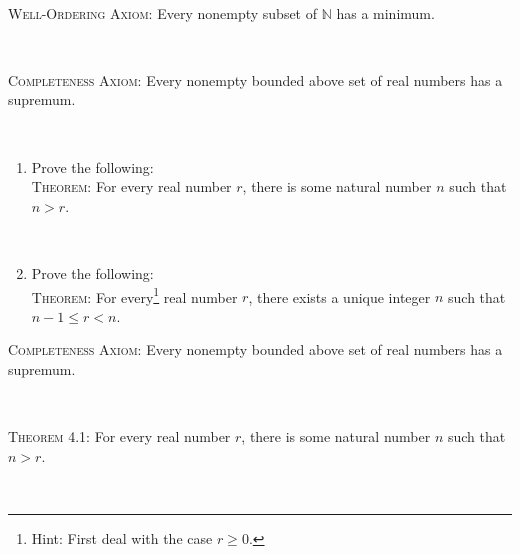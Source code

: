 \documentclass[12pt]{amsart}
\newcommand{\N}{\mathbb{N}}
\begin{document}
\

\newpage


\begin{framed}

\noindent \textsc{Well-Ordering Axiom:} Every nonempty subset of $\N$ has a minimum.

\

\noindent \textsc{Completeness Axiom:} Every nonempty bounded above set of real numbers has a supremum.
\end{framed}


\

\begin{enumerate}
\item Prove the following: \\
\textsc{Theorem:} For every real number $r$, there is some natural number $n$ such that $n>r$.

\

\item Prove the following:\\
\textsc{Theorem:} For every\footnote{Hint: First deal with the case $r\geq 0$.} real number $r$, there exists a unique integer $n$ such that $n-1\leq r < n$.
\end{enumerate}


\newpage
\begin{framed}
\noindent \textsc{Completeness Axiom:} Every nonempty bounded above set of real numbers has a supremum.

\


\noindent \textsc{Theorem 4.1:} For every real number $r$, there is some natural number $n$ such that $n>r$.
\end{framed}

\
\end{document}

